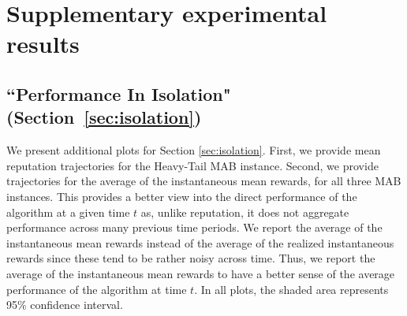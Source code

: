 \documentclass[../competing_bandits_with_appendix.tex]{subfiles}
\begin{document}
\section{Supplementary experimental results}
\label{app:expts}


\subsection{``Performance In Isolation" (Section~\ref{sec:isolation})}

We present additional plots for Section \ref{sec:isolation}. First, we provide mean reputation trajectories for the Heavy-Tail MAB instance. Second, we provide trajectories for the average of the instantaneous mean rewards, for all three MAB instances. This provides a better view into the direct performance of the algorithm at a given time $t$ as, unlike reputation, it does not aggregate performance across many previous time periods. We report the average of the instantaneous mean rewards instead of the average of the realized instantaneous rewards since these tend to be rather noisy across time. Thus, we report the average of the instantaneous mean rewards to have a better sense of the average performance of the algorithm at time $t$.
In all plots, the shaded area represents 95\% confidence interval.
\end{document}
